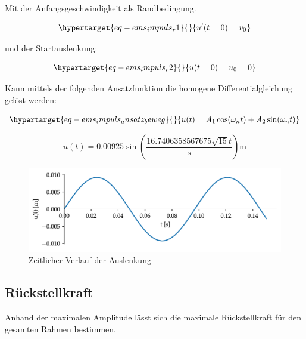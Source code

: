 \documentclass[
  letterpaper,
  DIV=11]{scrreprt}
\begin{document}
Mit der Anfangsgeschwindigkeit als Randbedingung.

\begin{equation}\protect\hypertarget{eq-ems_impuls_r1}{}{
u'(t=0) = v_0  
}\label{eq-ems_impuls_r1}\end{equation}

und der Startauslenkung:

\begin{equation}\protect\hypertarget{eq-ems_impuls_r2}{}{
u(t=0) = u_0 = 0 
}\label{eq-ems_impuls_r2}\end{equation}

Kann mittels der folgenden Ansatzfunktion die homogene
Differentialgleichung gelöst werden:

\begin{equation}\protect\hypertarget{eq-ems_impuls_ansatz_beweg}{}{
u(t) = A_1 \cos(\omega_n t) + A_2 \sin(\omega_n t)
}\label{eq-ems_impuls_ansatz_beweg}\end{equation}

\begin{equation}u{\left(t \right)} = 0.00925 \sin{\left(\frac{16.7406358567675 \sqrt{15} t}{\text{s}} \right)} \text{m}\end{equation}

\begin{figure}[H]

{\centering \includegraphics{index_files/mediabag/ems_02_files/figure-pdf/fig-ems_impuls_bewegungsfunk-output-1.pdf}

}

\caption{\label{fig-ems_impuls_bewegungsfunk}Zeitlicher Verlauf der
Auslenkung}

\end{figure}

\hypertarget{ruxfcckstellkraft}{%
\subsection{Rückstellkraft}\label{ruxfcckstellkraft}}

Anhand der maximalen Amplitude lässt sich die maximale Rückstellkraft
für den gesamten Rahmen bestimmen.
\end{document}
